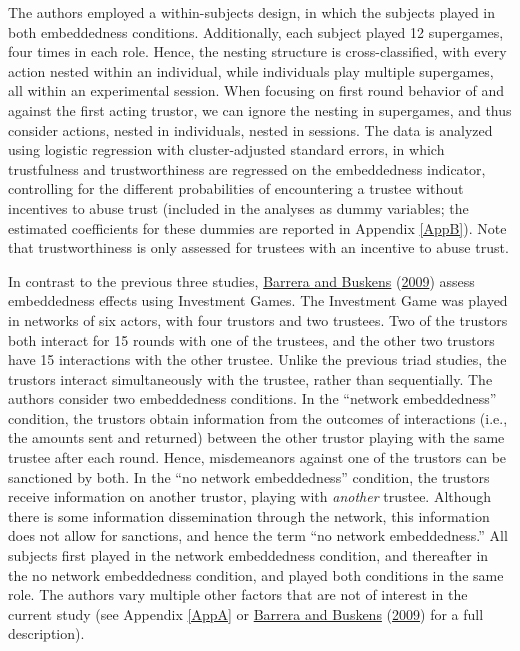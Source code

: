 \documentclass[
  11pt,
]{article}
\begin{document}
The authors employed a within-subjects design, in which the subjects played in both embeddedness conditions.
Additionally, each subject played 12 supergames, four times in each role. Hence, the nesting structure is cross-classified, with every action nested within an individual, while individuals play multiple supergames, all within an experimental session.
When focusing on first round behavior of and against the first acting trustor, we can ignore the nesting in supergames, and thus consider actions, nested in individuals, nested in sessions.
The data is analyzed using logistic regression with cluster-adjusted standard errors, in which trustfulness and trustworthiness are regressed on the embeddedness indicator, controlling for the different probabilities of encountering a trustee without incentives to abuse trust (included in the analyses as dummy variables; the estimated coefficients for these dummies are reported in Appendix \ref{AppB}).
Note that trustworthiness is only assessed for trustees with an incentive to abuse trust.

In contrast to the previous three studies, \protect\hyperlink{ref-barrera_buskens_third_2009}{Barrera and Buskens} (\protect\hyperlink{ref-barrera_buskens_third_2009}{2009}) assess embeddedness effects using Investment Games.
The Investment Game was played in networks of six actors, with four trustors and two trustees.
Two of the trustors both interact for 15 rounds with one of the trustees, and the other two trustors have 15 interactions with the other trustee.
Unlike the previous triad studies, the trustors interact simultaneously with the trustee, rather than sequentially.
The authors consider two embeddedness conditions.
In the ``network embeddedness'' condition, the trustors obtain information from the outcomes of interactions (i.e., the amounts sent and returned) between the other trustor playing with the same trustee after each round.
Hence, misdemeanors against one of the trustors can be sanctioned by both.
In the ``no network embeddedness'' condition, the trustors receive information on another trustor, playing with \emph{another} trustee.
Although there is some information dissemination through the network, this information does not allow for sanctions, and hence the term ``no network embeddedness.''
All subjects first played in the network embeddedness condition, and thereafter in the no network embeddedness condition, and played both conditions in the same role.
The authors vary multiple other factors that are not of interest in the current study (see Appendix \ref{AppA} or \protect\hyperlink{ref-barrera_buskens_third_2009}{Barrera and Buskens} (\protect\hyperlink{ref-barrera_buskens_third_2009}{2009}) for a full description).
\end{document}
